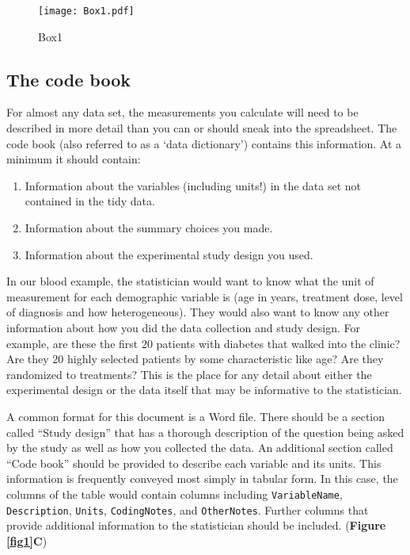 \documentclass[12pt]{article}
\providecommand{\tightlist}{%
  \setlength{\itemsep}{0pt}\setlength{\parskip}{0pt}}
\begin{document}
\begin{figure}[htbp]
\centering
\texttt{[image: Box1.pdf]}
\caption{Box1 \label{box1}}
\end{figure}

\subsection{The code book}\label{the-code-book}

For almost any data set, the measurements you calculate will need to be
described in more detail than you can or should sneak into the
spreadsheet. The code book (also referred to as a `data dictionary')
contains this information. At a minimum it should contain:

\begin{enumerate}
\def\labelenumi{\arabic{enumi}.}
\tightlist
\item
  Information about the variables (including units!) in the data set not
  contained in the tidy data.
\item
  Information about the summary choices you made.
\item
  Information about the experimental study design you used.
\end{enumerate}

In our blood example, the statistician would want to know what the unit
of measurement for each demographic variable is (age in years, treatment
dose, level of diagnosis and how heterogeneous). They would also want to
know any other information about how you did the data collection and
study design. For example, are these the first 20 patients with diabetes
that walked into the clinic? Are they 20 highly selected patients by
some characteristic like age? Are they randomized to treatments? This is
the place for any detail about either the experimental design or the
data itself that may be informative to the statistician.

A common format for this document is a Word file. There should be a
section called ``Study design'' that has a thorough description of the
question being asked by the study as well as how you collected the data.
An additional section called ``Code book'' should be provided to
describe each variable and its units. This information is frequently
conveyed most simply in tabular form. In this case, the columns of the
table would contain columns including \texttt{VariableName},
\texttt{Description}, \texttt{Units}, \texttt{CodingNotes}, and
\texttt{OtherNotes}. Further columns that provide additional information
to the statistician should be included. (\textbf{Figure \ref{fig1}C})
\end{document}
